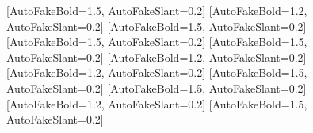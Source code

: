[AutoFakeBold=1.5, AutoFakeSlant=0.2]
[AutoFakeBold=1.2, AutoFakeSlant=0.2]
[AutoFakeBold=1.5, AutoFakeSlant=0.2]
[AutoFakeBold=1.5, AutoFakeSlant=0.2]
[AutoFakeBold=1.5, AutoFakeSlant=0.2]
[AutoFakeBold=1.2, AutoFakeSlant=0.2]
[AutoFakeBold=1.2, AutoFakeSlant=0.2]
[AutoFakeBold=1.5, AutoFakeSlant=0.2]
[AutoFakeBold=1.5, AutoFakeSlant=0.2]
[AutoFakeBold=1.2, AutoFakeSlant=0.2]
[AutoFakeBold=1.5, AutoFakeSlant=0.2]
\newcommand{\songti}{\CJKfamily{songti}}
\newcommand{\heiti}{\CJKfamily{heiti}}
\newcommand{\fangsong}{\CJKfamily{fangsong}}
\newcommand{\kaishu}{\CJKfamily{kaishu}}
\newcommand{\thmheiti}{\CJKfamily{heiti}}
